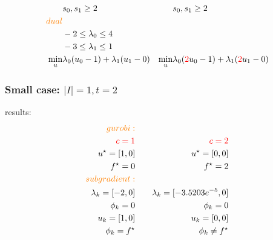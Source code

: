 \begin{frame}
\begin{align*}
                           & s_0, s_1 \ge 2                                     &                       & s_0, s_1 \ge 2                                                               \\
    \textcolor{orange}{dual}                                                                                                                                                           \\
                           & -2 \le \lambda_0 \le 4                             &                       &                                                                              \\
                           & -3 \le \lambda_1 \le 1                                                                                                                                    \\
    \min_u                 & \lambda_0 (u_0 - 1) + \lambda_1 (u_1 - 0)          & \min_u                & \lambda_0 (\textcolor{red}{2}u_0 - 1)+ \lambda_1 (\textcolor{red}{2}u_1 - 0)
  \end{align*}

\end{frame}
\begin{frame}
  \frametitle{Small case: \(|I| = 1, t = 2\) }
  results:
  \begin{align*}
    \textcolor{orange}{gurobi:}                                      \\
    \textcolor{red}{c = 1} &       & \textcolor{red}{c =2}           \\
    u^\star = [1, 0]       & \quad & u^\star = [0, 0]                \\
    f^\star = 0            &       & f^\star = 2                     \\
    \textcolor{orange}{subgradient:}                                 \\
    \lambda_k = [-2, 0]    &       & \lambda_k = [-3.5203e^{-5},  0] \\
    \phi_k = 0             &       & \phi_k = 0                      \\
    u_k = [1, 0]           &       & u_k = [0, 0]                    \\
    \phi_k = f^\star       &       & \phi_k \neq f^\star
  \end{align*}

\end{frame}


